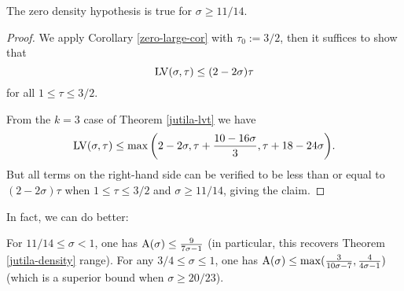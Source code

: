 \begin{theorem}\label{jutila-density} \cite{jutila_zero_density_1977} The zero density hypothesis is true for $\sigma \geq 11/14$.
\end{theorem}
\derived
{}

\begin{proof}
We apply Corollary \ref{zero-large-cor} with $\tau_0 := 3/2$, then it suffices to show that
    $$\mathrm{LV}(\sigma,\tau) \leq (2-2\sigma) \tau$$
    for all $1 \leq \tau \leq 3/2$.

    From the $k=3$ case of Theorem \ref{jutila-lvt} we have
    $$\mathrm{LV}(\sigma,\tau) \leq \max \bigg(2-2\sigma, \tau + \frac{10-16\sigma}{3}, \tau + 18-24\sigma \bigg).$$
    But all terms on the right-hand side can be verified to be less than or equal to $(2-2\sigma)\tau$ when $1 \leq \tau \leq 3/2$ and $\sigma \geq 11/14$, giving the claim.
\end{proof}

In fact, we can do better:

\begin{theorem}\label{hb-density} \cite{heathbrown_zero_1979} For $11/14 \leq \sigma < 1$, one has $\mathrm{A}(\sigma) \leq \frac{9}{7\sigma - 1}$ (in particular, this recovers Theorem \ref{jutila-density} range).  For any $3/4 \leq \sigma \leq 1$, one has $\mathrm{A}(\sigma) \leq \max(\frac{3}{10\sigma-7}, \frac{4}{4\sigma-1})$ (which is a superior bound when $\sigma \geq 20/23$).
\end{theorem}
\derived
{}

